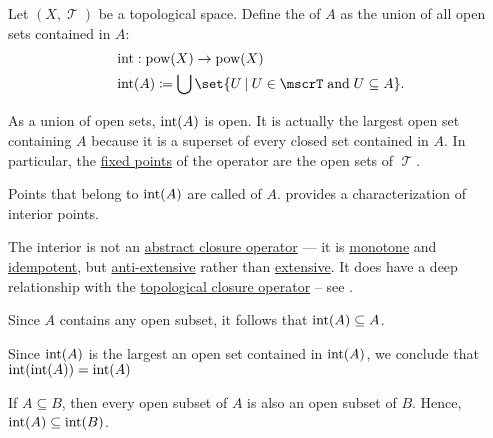 \begin{definition}\label{def:topological_interior_operator}
  Let \( (X, \mscrT) \) be a topological space. Define the  of \( A \) as the union of all open sets contained in \( A \):
  \begin{equation*}
    \begin{aligned}
      &\Int: \pow(X) \to \pow(X) \\
      &\Int(A) \coloneqq \bigcup \set{ U \given U \in \mscrT \T{and} U \subseteq A }.
    \end{aligned}
  \end{equation*}

  As a union of open sets, \( \operatorname{int}(A) \) is open. It is actually the largest open set containing \( A \) because it is a superset of every closed set contained in \( A \). In particular, the \hyperref[def:fixed_point]{fixed points} of the operator are the open sets of \( \mscrT \).

  Points that belong to \( \operatorname{int}(A) \) are called  of \( A \).  provides a characterization of interior points.

  The interior is not an \hyperref[def:abstract_closure_operator]{abstract closure operator} --- it is \hyperref[eq:def:partially_ordered_set/homomorphism/nonstrict]{monotone} and \hyperref[def:magma/idempotent]{idempotent}, but \hyperref[def:extensive_function]{anti-extensive} rather than \hyperref[def:extensive_function]{extensive}. It does have a deep relationship with the \hyperref[def:topological_closure_operator]{topological closure operator} -- see .
\end{definition}
\begin{defproof}
   Since \( A \) contains any open subset, it follows that \( \operatorname{int}(A) \subseteq A \).

   Since \( \operatorname{int}(A) \) is the largest an open set contained in \( \operatorname{int}(A) \), we conclude that \( \operatorname{int}(\operatorname{int}(A)) = \operatorname{int}(A) \)

   If \( A \subseteq B \), then every open subset of \( A \) is also an open subset of \( B \). Hence, \( \operatorname{int}(A) \subseteq \operatorname{int}(B) \).
\end{defproof}


